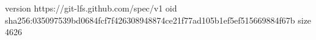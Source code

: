 version https://git-lfs.github.com/spec/v1
oid sha256:035097539bd0684fcf7f426308948874ce21f77ad105b1ef5ef515669884f67b
size 4626
